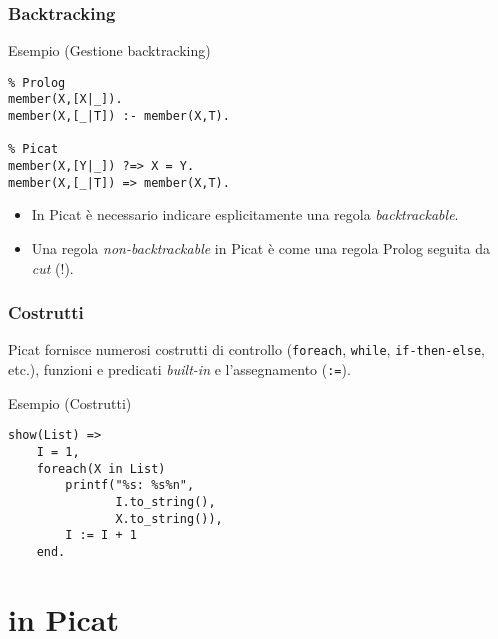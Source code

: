 \documentclass{beamer}
\begin{document}

\begin{frame}[fragile]
  \frametitle{Backtracking}
  
  \begin{exampleblock}{Esempio (Gestione backtracking)}
\begin{verbatim}
% Prolog 
member(X,[X|_]).
member(X,[_|T]) :- member(X,T).

% Picat
member(X,[Y|_]) ?=> X = Y.
member(X,[_|T]) => member(X,T).
\end{verbatim}
  \end{exampleblock}

  \begin{itemize}
  \item In Picat è necessario indicare esplicitamente una regola
    \emph{backtrackable}.
  \item Una regola \emph{non-backtrackable} in Picat è come una regola
    Prolog seguita da \emph{cut} (!).
  \end{itemize}
  
\end{frame}


\begin{frame}[fragile]
  \frametitle{Costrutti} 
  Picat fornisce numerosi costrutti di controllo (\texttt{foreach}, \texttt{while}, \texttt{if-then-else}, etc.), funzioni e predicati \emph{built-in} e l'assegnamento (\texttt{:=}).
  \begin{exampleblock}{Esempio (Costrutti)}
\begin{verbatim}
show(List) =>
    I = 1,
    foreach(X in List)
        printf("%s: %s%n", 
               I.to_string(), 
               X.to_string()),
        I := I + 1
    end.
\end{verbatim}
  \end{exampleblock}
\end{frame}


\section{\lset{} in Picat}
\end{document}
